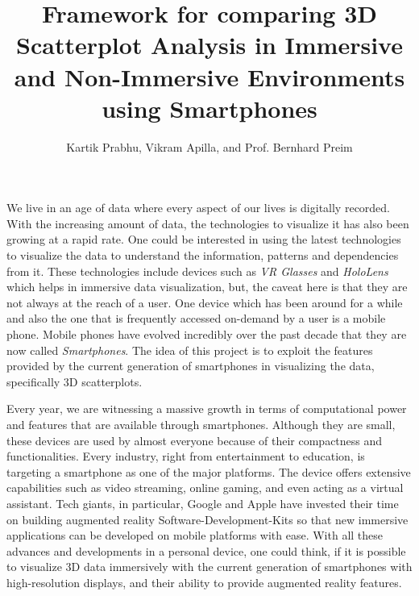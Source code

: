 \documentclass[journal]{vgtc}                %
\title{Framework for comparing 3D Scatterplot Analysis in Immersive and Non-Immersive Environments using Smartphones}
\author{Kartik Prabhu, Vikram Apilla, and Prof. Bernhard Preim}
\begin{document}


\maketitle
We live in an age of data where every aspect of our lives is digitally recorded. With the increasing amount of data, the technologies to visualize it has also been growing at a rapid rate. One could be interested in using the latest technologies to visualize the data to understand the information, patterns and dependencies from it. These technologies include devices such as \textit{VR Glasses} and \textit{HoloLens} which helps in immersive data visualization, but, the caveat here is that they are not always at the reach of a user. One device which has been around for a while and also the one that is frequently accessed on-demand by a user is a mobile phone. Mobile phones have evolved incredibly over the past decade that they are now called \textit{Smartphones}. The idea of this project is to exploit the features provided by the current generation of smartphones in visualizing the data, specifically 3D scatterplots.

Every year, we are witnessing a massive growth in terms of computational power and features that are available through smartphones. Although they are small, these devices are used by almost everyone because of their compactness and functionalities. Every industry, right from entertainment to education, is targeting a smartphone as one of the major platforms. The device offers extensive capabilities such as video streaming, online gaming, and even acting as a virtual assistant. Tech giants, in particular, Google and Apple have invested their time on building augmented reality Software-Development-Kits so that new immersive applications can be developed on mobile platforms with ease. With all these advances and developments in a personal device, one could think, if it is possible to visualize 3D data immersively with the current generation of smartphones with high-resolution displays, and their ability to provide augmented reality features.
\end{document}
